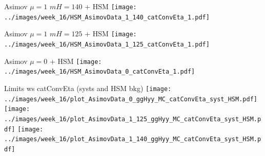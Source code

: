 \documentclass[10pt,UKenglish, leqno, xcolor = dvipsnames]{beamer}
\begin{document}
		\begin{frame}{Asimov $\mu=1$ $mH=140$ + HSM}
			\vfill
			\centering
			\texttt{[image: ../images/week\_16/HSM\_AsimovData\_1\_140\_catConvEta\_1.pdf]}
			\vfill
		\end{frame}
		
		\begin{frame}{Asimov $\mu=1$ $mH=125$ + HSM}
			\vfill
			\centering
			\texttt{[image: ../images/week\_16/HSM\_AsimovData\_1\_125\_catConvEta\_1.pdf]}
			\vfill
		\end{frame}
		
		\begin{frame}{Asimov $\mu=0$ + HSM}
			\vfill
			\centering
			\texttt{[image: ../images/week\_16/HSM\_AsimovData\_0\_catConvEta\_1.pdf]}
			\vfill
		\end{frame}
	
		\begin{frame}{Limits ws catConvEta (systs and HSM bkg)}
			\vfill
			\centering
			\texttt{[image: ../images/week\_16/plot\_AsimovData\_0\_ggHyy\_MC\_catConvEta\_syst\_HSM.pdf]}
			\texttt{[image: ../images/week\_16/plot\_AsimovData\_1\_125\_ggHyy\_MC\_catConvEta\_syst\_HSM.pdf]}
			\texttt{[image: ../images/week\_16/plot\_AsimovData\_1\_140\_ggHyy\_MC\_catConvEta\_syst\_HSM.pdf]}
			\vfill
		\end{frame}
	
\end{document}
